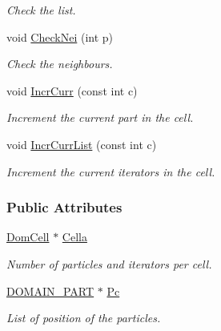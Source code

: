 \begin{DoxyCompactItemize}
\begin{DoxyCompactList}\small\item\em \-Check the list. \end{DoxyCompactList}\item 
\hypertarget{classDdDoubleLoop_ad6d4b1b657a39ed64c2c45d4706dbcc1}{void \hyperlink{classDdDoubleLoop_ad6d4b1b657a39ed64c2c45d4706dbcc1}{\-Check\-Nei} (int p)}\label{classDdDoubleLoop_ad6d4b1b657a39ed64c2c45d4706dbcc1}

\begin{DoxyCompactList}\small\item\em \-Check the neighbours. \end{DoxyCompactList}\item 
void \hyperlink{classDdDoubleLoop_ab61672aad0bc83dc07c8efd5a4543fc7}{\-Incr\-Curr} (const int c)
\begin{DoxyCompactList}\small\item\em \-Increment the current part in the cell. \end{DoxyCompactList}\item 
\hypertarget{classDdDoubleLoop_a0c040f6773c460a8eb46bff752c08d2d}{void \hyperlink{classDdDoubleLoop_a0c040f6773c460a8eb46bff752c08d2d}{\-Incr\-Curr\-List} (const int c)}\label{classDdDoubleLoop_a0c040f6773c460a8eb46bff752c08d2d}

\begin{DoxyCompactList}\small\item\em \-Increment the current iterators in the cell. \end{DoxyCompactList}\end{DoxyCompactItemize}
\subsubsection*{\-Public \-Attributes}
\begin{DoxyCompactItemize}
\item 
\hypertarget{classDdDoubleLoop_a34021657728255effd1ed64c5d0c5906}{\hyperlink{classDomCell}{\-Dom\-Cell} $\ast$ \hyperlink{classDdDoubleLoop_a34021657728255effd1ed64c5d0c5906}{\-Cella}}\label{classDdDoubleLoop_a34021657728255effd1ed64c5d0c5906}

\begin{DoxyCompactList}\small\item\em \-Number of particles and iterators per cell. \end{DoxyCompactList}\item 
\hypertarget{classDdDoubleLoop_a71fca1e109827e1efe1b06f386c44b40}{\hyperlink{structDOMAIN__PART}{\-D\-O\-M\-A\-I\-N\-\_\-\-P\-A\-R\-T} $\ast$ \hyperlink{classDdDoubleLoop_a71fca1e109827e1efe1b06f386c44b40}{\-Pc}}\label{classDdDoubleLoop_a71fca1e109827e1efe1b06f386c44b40}

\begin{DoxyCompactList}\small\item\em \-List of position of the particles. \end{DoxyCompactList}\end{DoxyCompactItemize}


